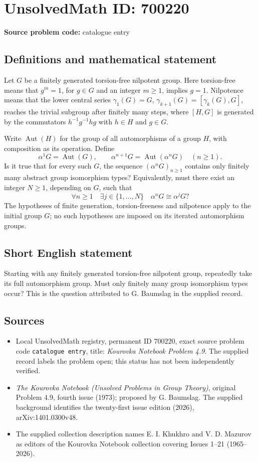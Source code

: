 \documentclass[11pt]{article}
\begin{document}
\section*{UnsolvedMath ID: 700220}
\textbf{Source problem code:} catalogue entry
\subsection{Definitions and mathematical statement}
Let \(G\) be a finitely generated torsion-free nilpotent group. Here torsion-free means that \(g^m=1\), for \(g\in G\) and an integer \(m\geq 1\), implies \(g=1\). Nilpotence means that the lower central series \(\gamma_1(G)=G\), \(\gamma_{k+1}(G)=[\gamma_k(G),G]\), reaches the trivial subgroup after finitely many steps, where \([H,G]\) is generated by the commutators \(h^{-1}g^{-1}hg\) with \(h\in H\) and \(g\in G\).

Write \(\operatorname{Aut}(H)\) for the group of all automorphisms of a group \(H\), with composition as its operation. Define
\[
\alpha^1G=\operatorname{Aut}(G),\qquad
\alpha^{n+1}G=\operatorname{Aut}(\alpha^nG)\quad(n\geq 1).
\]
Is it true that for every such \(G\), the sequence \((\alpha^nG)_{n\geq 1}\) contains only finitely many abstract group isomorphism types? Equivalently, must there exist an integer \(N\geq 1\), depending on \(G\), such that
\[
\forall n\geq 1\quad\exists j\in\{1,\ldots,N\}\quad
\alpha^nG\cong\alpha^jG?
\]
The hypotheses of finite generation, torsion-freeness and nilpotence apply to the initial group \(G\); no such hypotheses are imposed on its iterated automorphism groups.
\subsection{Short English statement}
Starting with any finitely generated torsion-free nilpotent group, repeatedly take its full automorphism group. Must only finitely many group isomorphism types occur? This is the question attributed to G. Baumslag in the supplied record.
\subsection{Sources}
\begin{itemize}
\item Local UnsolvedMath registry, permanent ID \(700220\), exact source problem code \texttt{catalogue entry}, title: \emph{Kourovka Notebook Problem 4.9}. The supplied record labels the problem open; this status has not been independently verified.
\item \emph{The Kourovka Notebook (Unsolved Problems in Group Theory)}, original Problem 4.9, fourth issue (1973); proposed by G. Baumslag. The supplied background identifies the twenty-first issue edition (2026), arXiv:1401.0300v48.
\item The supplied collection description names E. I. Khukhro and V. D. Mazurov as editors of the Kourovka Notebook collection covering Issues 1--21 (1965--2026).
\end{itemize}
\end{document}
